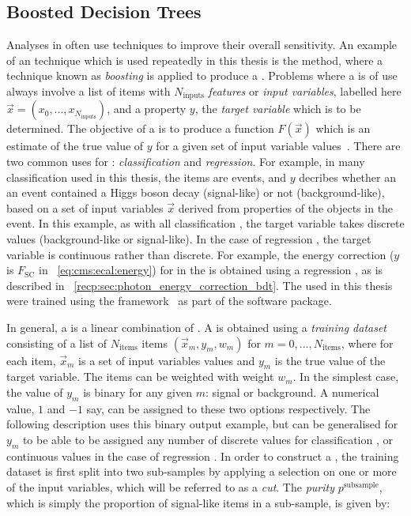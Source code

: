\subsection{Boosted Decision Trees}
\label{reco:sec:bdt}

Analyses in \HEP often use \MVA techniques to improve their overall sensitivity. An example of an \MVA technique which is used repeatedly in this thesis is the \DT method, where a technique known as \emph{boosting} is applied to produce a \BDT. Problems where a \BDT is of use always involve a list of items with $N_{\textrm{inputs}}$ \emph{features} or \emph{input variables}, labelled here $\vec{x} =(x_0, ... ,x_{N_{\textrm{inputs}}})$, and a property $y$, the \emph{target variable} which is to be determined. The objective of a \BDT is to produce a function $F(\vec{x})$ which is an estimate of the true value of $y$ for a given set of input variable values~\cite{friedman2001}. There are two common uses for \BDT\s: \emph{classification} and \emph{regression}. For example, in many classification \BDT\s used in this thesis, the items are events, and $y$ decribes whether an an event contained a Higgs boson decay (signal-like) or not (background-like), based on a set of input variables $\vec{x}$ derived from properties of the \PF objects in the event. In this example, as with all classification \BDT\s, the target variable takes discrete values (background-like or signal-like). In the case of regression \BDT\s, the target variable is  continuous rather than discrete. For example, the energy correction ($y$ is $F_{\text{SC}}$ in \Eq~\ref{eq:cms:ecal:energy}) for \SC\s in the \ECAL is obtained using a regression \BDT, as is described in \Sec~\ref{recp:sec:photon_energy_correction_bdt}. The \BDT\s used in this thesis were trained using the \TMVA framework~\cite{TMVA} as part of the \ROOT software package. 

In general, a \BDT is a linear combination of \DT\s. A \DT is obtained using a \emph{training dataset} consisting of a list of $N_{\textrm{items}}$ items $(\vec{x}_{m},y_{m},w_{m})$ for $m=0,...,N_{\textrm{items}}$, where for each item, $\vec{x}_{m}$ is a set of input variables values and $y_{m}$ is the true value of the target variable. The items can be weighted with weight $w_{m}$. In the simplest case, the value of $y_{m}$ is binary for any given $m$: signal or background. A numerical value, $1$ and $-1$ say, can be assigned to these two options respectively. The following description uses this binary output example, but can be generalised for $y_{m}$ to be able to be assigned any number of discrete values for classification \DT\s, or continuous values in the case of regression \DT\s.
In order to construct a \DT, the training dataset is first split into two sub-samples by applying a selection on one or more of the input variables, which will be referred to as a \emph{cut}. The \emph{purity} $p^{\textrm{subsample}}$, which is simply the proportion of signal-like items in a sub-sample, is given by:

